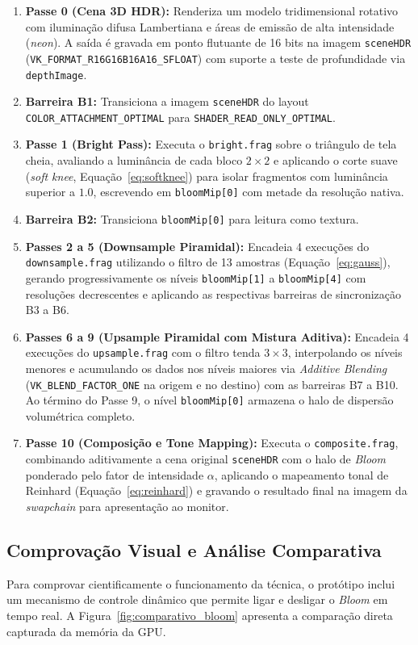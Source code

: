 \begin{enumerate}
    \setlength{\itemsep}{0pt}
    \item \textbf{Passe 0 (Cena 3D HDR):} Renderiza um modelo tridimensional rotativo com iluminação difusa Lambertiana e áreas de emissão de alta intensidade (\textit{neon}). A saída é gravada em ponto flutuante de 16 bits na imagem \texttt{sceneHDR} (\texttt{VK\_FORMAT\_R16G16B16A16\_SFLOAT}) com suporte a teste de profundidade via \texttt{depthImage}.
    \item \textbf{Barreira B1:} Transiciona a imagem \texttt{sceneHDR} do layout \texttt{COLOR\_ATTACHMENT\_OPTIMAL} para \texttt{SHADER\_READ\_ONLY\_OPTIMAL}.
    \item \textbf{Passe 1 (Bright Pass):} Executa o \texttt{bright.frag} sobre o triângulo de tela cheia, avaliando a luminância de cada bloco $2\times2$ e aplicando o corte suave (\textit{soft knee}, Equação~\ref{eq:softknee}) para isolar fragmentos com luminância superior a $1.0$, escrevendo em \texttt{bloomMip[0]} com metade da resolução nativa.
    \item \textbf{Barreira B2:} Transiciona \texttt{bloomMip[0]} para leitura como textura.
    \item \textbf{Passes 2 a 5 (Downsample Piramidal):} Encadeia 4 execuções do \texttt{downsample.frag} utilizando o filtro de 13 amostras (Equação~\ref{eq:gauss}), gerando progressivamente os níveis \texttt{bloomMip[1]} a \texttt{bloomMip[4]} com resoluções decrescentes e aplicando as respectivas barreiras de sincronização B3 a B6.
    \item \textbf{Passes 6 a 9 (Upsample Piramidal com Mistura Aditiva):} Encadeia 4 execuções do \texttt{upsample.frag} com o filtro tenda $3\times3$, interpolando os níveis menores e acumulando os dados nos níveis maiores via \textit{Additive Blending} (\texttt{VK\_BLEND\_FACTOR\_ONE} na origem e no destino) com as barreiras B7 a B10. Ao término do Passe 9, o nível \texttt{bloomMip[0]} armazena o halo de dispersão volumétrica completo.
    \item \textbf{Passe 10 (Composição e Tone Mapping):} Executa o \texttt{composite.frag}, combinando aditivamente a cena original \texttt{sceneHDR} com o halo de \textit{Bloom} ponderado pelo fator de intensidade $\alpha$, aplicando o mapeamento tonal de Reinhard (Equação~\ref{eq:reinhard}) e gravando o resultado final na imagem da \textit{swapchain} para apresentação ao monitor.
\end{enumerate}

\subsection{Comprovação Visual e Análise Comparativa}
Para comprovar cientificamente o funcionamento da técnica, o protótipo inclui um mecanismo de controle dinâmico que permite ligar e desligar o \textit{Bloom} em tempo real. A Figura~\ref{fig:comparativo_bloom} apresenta a comparação direta capturada da memória da GPU.

